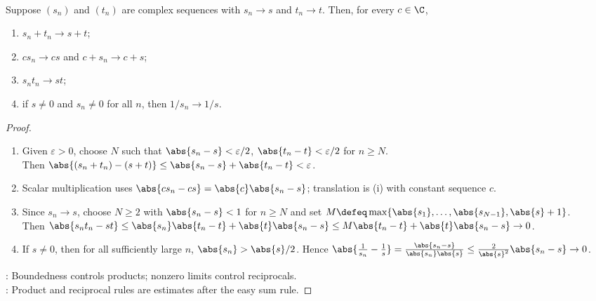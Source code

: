 \begin{theorem} \label{thm:complex-sequence-limit-algebra} \\
Suppose $(s_n)$ and $(t_n)$ are complex sequences with $s_n\to s$ and $t_n\to t$. Then, for every $c\in\C$,
\begin{enumerate}[label=(\roman*)]
\setlength{\itemsep}{0pt}
\item $s_n+t_n\to s+t$;
\item $cs_n\to cs$ and $c+s_n\to c+s$;
\item $s_nt_n\to st$;
\item if $s\neq0$ and $s_n\neq0$ for all $n$, then $1/s_n\to1/s$.
\end{enumerate}
\begin{proof}
\begin{enumerate}[label=(\roman*)]
\setlength{\itemsep}{0pt}
\item Given $\varepsilon>0$, choose $N$ such that $\abs{s_n-s}<\varepsilon/2$, $\abs{t_n-t}<\varepsilon/2$ for $n\geq N$.\\
Then $\abs{(s_n+t_n)-(s+t)}\leq\abs{s_n-s}+\abs{t_n-t}<\varepsilon$.
\item Scalar multiplication uses $\abs{cs_n-cs}=\abs{c}\abs{s_n-s}$; translation is (i) with constant sequence $c$.
\item Since $s_n\to s$, choose $N\geq2$ with $\abs{s_n-s}<1$ for $n\geq N$ and set $M\defeq\max\{\abs{s_1},\ldots,\abs{s_{N-1}},\abs{s}+1\}$.\\
Then $\abs{s_nt_n-st}\leq \abs{s_n}\abs{t_n-t}+\abs{t}\abs{s_n-s}\leq M\abs{t_n-t}+\abs{t}\abs{s_n-s}\to0$.
\item If $s\neq0$, then for all sufficiently large $n$, $\abs{s_n}>\abs{s}/2$. Hence $\abs{\frac1{s_n}-\frac1s}=\frac{\abs{s_n-s}}{\abs{s_n}\abs{s}}\leq \frac{2}{\abs{s}^2}\abs{s_n-s}\to0$.
\end{enumerate}
: Boundedness controls products; nonzero limits control reciprocals.\\
: Product and reciprocal rules are estimates after the easy sum rule.
\end{proof}
\end{theorem}


